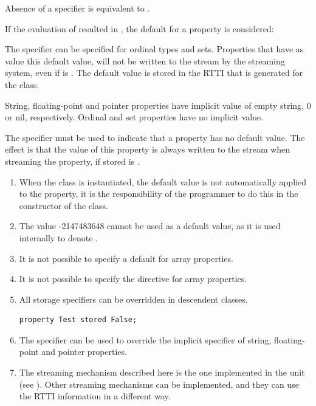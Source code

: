 \begin{remark}
Absence of a  specifier is equivalent to .
\end{remark}

If the evaluation of  resulted in , the default for a
property is considered:

The  specifier can be specified for ordinal types and sets.
Properties that have as value this default value, will not be written to
the stream by the streaming system, even if  is .
The default value is stored in the RTTI that is generated for the class.

String, floating-point and pointer properties have implicit 
value of empty string, 0 or nil, respectively.
Ordinal and set properties have no implicit  value.

The  specifier must be used to indicate
that a property has no default value. The effect is that the value of this
property is always written to the stream when streaming the property, if
stored is .

\begin{remark}
\begin{enumerate}
\item When the class is instantiated, the default value is not automatically
applied to the property, it is the responsibility of the programmer to do
this in the constructor of the class.
\item The value -2147483648 cannot be used as a default value, as it is used
internally to denote .
\item It is not possible to specify a default for array properties.
\item It is not possible to specify the  directive for array properties.
\item All storage specifiers can be overridden in descendent classes.
\begin{verbatim}
property Test stored False;
\end{verbatim}
\item The  specifier can be used to override the implicit
 specifier of string, floating-point and pointer properties.
\item The streaming mechanism described here is the one implemented in the
 unit (see \unitsref). Other streaming mechanisms can be
implemented, and they can use the RTTI information in a different way.
\end{enumerate}
\end{remark}

